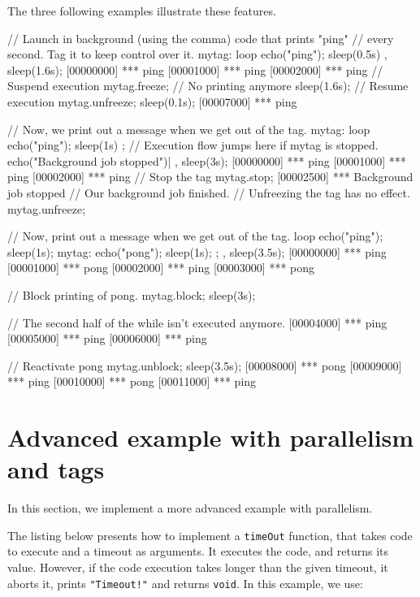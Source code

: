 The three following examples illustrate these features.

\begin{urbiscript}[firstnumber=1]
// Launch in background (using the comma) code that prints "ping"
// every second.  Tag it to keep control over it.
mytag:
{
  loop
  {
    echo("ping");
    sleep(0.5s)
  }
},
sleep(1.6s);
[00000000] *** ping
[00001000] *** ping
[00002000] *** ping
// Suspend execution
mytag.freeze;
// No printing anymore
sleep(1.6s);
// Resume execution
mytag.unfreeze;
sleep(0.1s);
[00007000] *** ping
\end{urbiscript}

\begin{urbiscript}[firstnumber=1]
// Now, we print out a message when we get out of the tag.
{
  mytag:
  {
    loop
    {
      echo("ping"); sleep(1s)
    }
  };
  // Execution flow jumps here if mytag is stopped.
  echo("Background job stopped")|
},
sleep(3s);
[00000000] *** ping
[00001000] *** ping
[00002000] *** ping
// Stop the tag
mytag.stop;
[00002500] *** Background job stopped
// Our background job finished.
// Unfreezing the tag has no effect.
mytag.unfreeze;
\end{urbiscript}

\begin{urbiscript}[firstnumber=1]
// Now, print out a message when we get out of the tag.
loop
{
  echo("ping"); sleep(1s);
  mytag: { echo("pong"); sleep(1s); };
},
sleep(3.5s);
[00000000] *** ping
[00001000] *** pong
[00002000] *** ping
[00003000] *** pong

// Block printing of pong.
mytag.block;
sleep(3s);

// The second half of the while isn't executed anymore.
[00004000] *** ping
[00005000] *** ping
[00006000] *** ping

// Reactivate pong
mytag.unblock;
sleep(3.5s);
[00008000] *** pong
[00009000] *** ping
[00010000] *** pong
[00011000] *** ping
\end{urbiscript}

\section{Advanced example with parallelism and tags}

In this section, we implement a more advanced example with
parallelism.

The listing below presents how to implement a \lstinline{timeOut}
function, that takes code to execute and a timeout as arguments. It
executes the code, and returns its value. However, if the code
execution takes longer than the given timeout, it aborts it, prints
\lstinline|"Timeout!"| and returns \lstinline|void|. In this example, we use:

